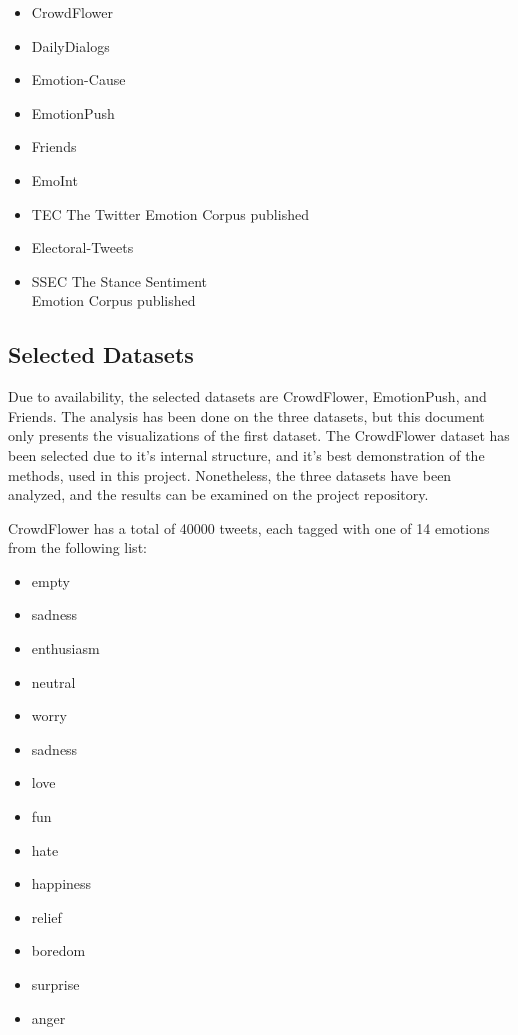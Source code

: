 \begin{itemize}
  \item CrowdFlower %
  \item DailyDialogs~\cite{li2017dailydialog} %
  \item Emotion-Cause~\cite{ghazi2015detecting} %
  \item EmotionPush~\cite{huang2018emotionpush} %
  \item Friends~\cite{chen2018emotionlines} %
  \item EmoInt~\cite{MohammadB17starsem} %
  \item TEC The Twitter Emotion Corpus published~\cite{mohammad2012emotional} %
  \item Electoral-Tweets~\cite{mohammad2014semantic} %
  \item SSEC The Stance Sentiment \\ Emotion Corpus published~\cite{schuff2017annotation} %
\end{itemize}

\subsection{Selected Datasets}\label{sub:Selected Datasets}
Due to availability, the selected datasets are CrowdFlower, EmotionPush, and Friends. The analysis has been done on the three datasets, but this document only presents the visualizations of the first dataset. The CrowdFlower dataset has been selected due to it's internal structure, and it's best demonstration of the methods, used in this project. Nonetheless, the three datasets have been analyzed, and the results can be examined on the project repository.

CrowdFlower has a total of 40000 tweets, each tagged with one of 14 emotions from the following list:

\begin{itemize}
  \item empty
  \item sadness
  \item enthusiasm
  \item neutral
  \item worry
  \item sadness
  \item love
  \item fun
  \item hate
  \item happiness
  \item relief
  \item boredom
  \item surprise
  \item anger
\end{itemize}

